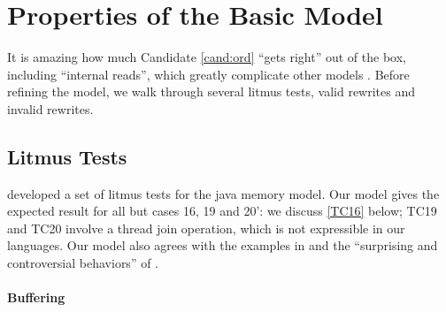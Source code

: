 \section{Properties of the Basic Model}
\label{sec:props}

It is amazing how much Candidate \ref{cand:ord} ``gets right'' out of the
box, including ``internal reads'', which greatly complicate other models
\cite{DBLP:journals/pacmpl/PulteFDFSS18}.  Before refining the model, we walk
through several litmus tests, valid rewrites and invalid rewrites.

\subsection{Litmus Tests}
\label{sec:litmus}




\citet{PughWebsite} developed a set of litmus tests for the java memory
model.  Our model gives the expected result for all but cases 16, 19 and 20':
we discuss \ref{TC16} below; TC19 and TC20 involve a thread join operation,
which is not expressible in our languages.  Our model also agrees with the
\oota{} examples in \citet[]{DBLP:conf/esop/BattyMNPS15} and
the ``surprising and controversial behaviors'' of \citet[]{Manson:2005:JMM:1047659.1040336}.

\paragraph{Buffering}

